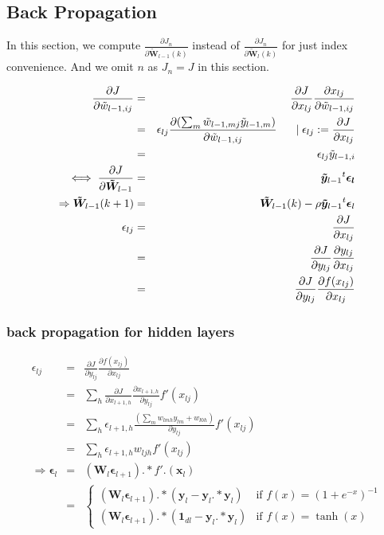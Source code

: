 \documentclass{article}
\begin{document}
\subsection{Back Propagation}
In this section, we compute $\frac{\partial J_n}{\partial
  \bm{\tilde{W}}_{l-1}(k)}$ instead of $\frac{\partial J_n}{\partial
  \bm{\tilde{W}}_{l}(k)}$ for just index convenience.
And we omit $n$ as $J_n = J$ in this section.

\begin{eqnarray}
  \frac{\partial J}{\partial \tilde{w}_{l-1,ij}}
  &=& \frac{\partial J}{\partial x_{lj}} \frac{\partial x_{lj}}{\partial
    \tilde{w}_{l-1,ij}} \\
  &=& \epsilon_{lj} \frac{\partial (\sum_m{\tilde{w}_{l-1,mj}
      \tilde{y}_{l-1,m}})}{\partial \tilde{w}_{l-1,ij}}
  \hspace{5mm} \mid \epsilon_{lj} :=  \frac{\partial J}{\partial x_{lj}}\\
  &=& \epsilon_{lj} \tilde{y}_{l-1,i}\\
  \iff \frac{\partial J}{\partial \bm{\tilde{W}}_{l-1}}
  &=& \bm{\tilde{y}}_{l-1} {}^t\bm{\epsilon_{l}}\\
  \Rightarrow \bm{\tilde{W}}_{l-1}(k+1) &=& \bm{\tilde{W}}_{l-1}(k) - \rho \bm{\tilde{y}}_{l-1}{}^t\bm{\epsilon}_l\\
  \epsilon_{lj} &=&  \frac{\partial J}{\partial x_{lj}}\\
  &=& \frac{\partial J}{\partial y_{lj}} \frac{\partial
    y_{lj}}{\partial x_{lj}}\\
  &=& \frac{\partial J}{\partial y_{lj}} \frac{\partial
    f(x_{lj})}{\partial x_{lj}}\\
\end{eqnarray}

\subsubsection{back propagation for hidden layers}
\begin{eqnarray}
  \epsilon_{lj} 
  &=& \frac{\partial J}{\partial y_{lj}} \frac{\partial
    f(x_{lj})}{\partial x_{lj}}\\
  &=& \sum_h \frac{\partial J}{\partial x_{l+1,h}} \frac{\partial
      x_{l+1,h}}{\partial y_{lj}} f'({x}_{lj})\\
  &=& \sum_h \epsilon_{l+1,h} 
    \frac{(\sum_m w_{lmh}y_{lm} + w_{l0h})}{\partial y_{lj}}  f'({x}_{lj})\\
  &=& \sum_h \epsilon_{l+1,h} w_{ljh}  f'({x}_{lj})\\
  \Rightarrow 
  \bm{\epsilon}_l &=& (\bm{W}_l\bm{\epsilon}_{l+1}) .* f'.(\bm{x}_l)\\
  &=&
  \begin{cases}
    (\bm{W}_l \bm{\epsilon}_{l+1}).*(\bm{y}_l-\bm{y}_l.*\bm{y}_l)
    &\mbox{if } f(x)=(1+e^{-x})^{-1}\\
    (\bm{W}_l \bm{\epsilon}_{l+1}).*(\bm{1}_{dl}-\bm{y}_l.*\bm{y}_l)
    &\mbox{if } f(x)=\tanh(x)
  \end{cases}
\end{eqnarray}
\end{document}
